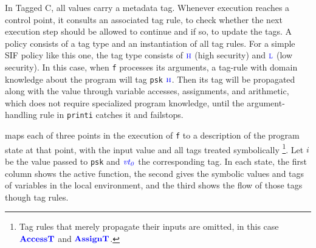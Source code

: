 \documentclass{llncs}
\begin{document}
In Tagged C, all values carry a metadata tag. Whenever execution reaches a control point, it consults
an associated tag rule, to check whether the next execution step should be allowed to continue and
if so, to update the tags. A policy consists of a tag type and an instantiation of all tag rules.
For a simple SIF policy like this one, the tag type consists of \(\high\) (high security) and \(\low\) (low security).
In this case, when {\tt f} processes its arguments, a tag-rule with domain knowledge about the program
will tag {\tt psk} \(\high\). Then its tag will be propagated along with the value through variable accesses,
assignments, and arithmetic, which does not require specialized program knowledge, until the argument-handling
rule in {\tt printi} catches it and failstops.

 maps each of three points in the execution of {\tt f} to a description of the program
state at that point, with the input value and all tags treated symbolically
\footnote{Tag rules that merely propagate their inputs are omitted,
in this case \(\accesstname\) and \(\assigntname\).}.
Let \(i\) be the value passed to {\tt psk}
and \(\vt[_0]\) the corresponding tag. In each state, the first column
shows the active function, the second gives the symbolic values and tags
of variables in the local environment, and the third shows the flow of those tags though
tag rules.
\end{document}
